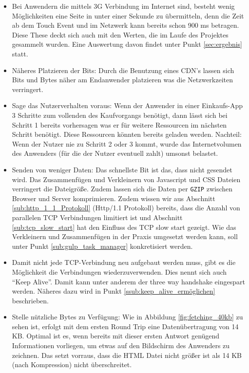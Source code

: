 \begin{itemize}
			\item Bei Anwendern die mittels 3G Verbindung im Internet sind, besteht wenig Möglichkeiten eine Seite in unter einer Sekunde zu übermitteln, denn die Zeit ab dem Touch Event und im Netzwerk kann bereits schon 900 ms betragen. Diese These deckt sich auch mit den Werten, die im Laufe des Projektes gesammelt wurden. Eine Auswertung davon findet unter Punkt \ref{sec:ergebnis} statt.

			\item Näheres Platzieren der Bits: Durch die Benutzung eines CDN's lassen sich Bits und Bytes näher am Endanwender platzieren was die Netzwerkzeiten verringert.

			\item Sage das Nutzerverhalten voraus: Wenn der Anwender in einer Einkaufs-App 3 Schritte zum vollenden des Kaufvorgangs benötigt, dann lässt sich bei Schritt 1 bereits vorhersagen was er für weitere Ressourcen im nächsten Schritt benötigt. Diese Ressourcen könnten bereits geladen werden. Nachteil: Wenn der Nutzer nie zu Schritt 2 oder 3 kommt, wurde das Internetvolumen des Anwenders (für die der Nutzer eventuell zahlt) umsonst belastet.

			\item Senden von weniger Daten: Das schnellste Bit ist das, dass nicht gesendet wird. Das Zusammenfügen und Verkleinern von Javascript und CSS Dateien verringert die Dateigröße. Zudem lassen sich die Daten per \texttt{GZIP} zwischen Browser und Server komprimieren. Zudem wissen wir aus Abschnitt \ref{sub:http_1_1_Protokoll} (Http/1.1 Protokoll) bereits, dass die Anzahl von parallelen TCP Verbindungen limitiert ist und Abschnitt \ref{sub:tcp_slow_start} hat den Einfluss des TCP slow start gezeigt. Wie das Verkleinern und Zusammenfügen in der Praxis umgesetzt werden kann, soll unter Punkt \ref{sub:gulp_task_manager} konkretisiert werden.

			\item Damit nicht jede TCP-Verbindung neu aufgebaut werden muss, gibt es die Möglichkeit die Verbindungen wiederzuverwenden. Dies nennt sich auch "`Keep Alive"'. Damit kann unter anderem der three way handshake eingespart werden. Näheres dazu wird in Punkt \ref{ssub:keep_alive_ermöglichen} beschrieben.

			\item Stelle nützliche Bytes zu Verfügung: Wie in Abbildung \ref{fig:fetching_40kb} zu sehen ist, erfolgt mit dem ersten Round Trip eine Datenübertragung von  14 KB. Optimal ist es, wenn bereits mit dieser ersten Antwort genügend Informationen vorliegen, um etwas auf den Bildschirm des Anwenders zu zeichnen. Das setzt vorraus, dass die HTML Datei nicht größer ist als 14 KB (nach Kompression) nicht überschreitet.

		\end{itemize}

